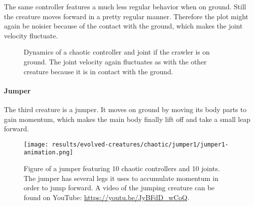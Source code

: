 \documentclass[main]{subfiles}
\begin{document}
The same controller features a much less regular behavior when on ground. %
%
Still the creature moves forward in a pretty regular manner. %
%
Therefore the plot might again be noisier because of the contact with the ground, which makes the joint velocity fluctuate. %

\begin{figure}[H]
\centering
	\begin{minipage}{1.3\textwidth}
	\hspace*{-5em}
	\end{minipage}
\caption[On ground controller dynamics of the crawler]{Dynamics of a chaotic controller and joint if the crawler is on ground. The joint velocity again fluctuates as with the other creature because it is in contact with the ground.}
\label{figure:crawler1-on-ground-controller-dynamics}
\end{figure}

\paragraph{Jumper}

The third creature is a jumper. It moves on ground by moving its body parts to gain momentum, which makes the main body finally lift off and take a small leap forward.

\begin{figure}[H]
\centering
\texttt{[image: results/evolved-creatures/chaotic/jumper1/jumper1-animation.png]}
\caption[Figure of a jumper using chaotic controllers.]{Figure of a jumper featuring 10 chaotic controllers and 10 joints. The jumper has several legs it uses to accumulate momentum in order to jump forward. A video of the jumping creature can be found on YouTube: \url{https://youtu.be/JyBFdD_wCoQ}.}
\label{figure:successfulcreatures-chaotic-crawler1}
\end{figure} 
\end{document}
